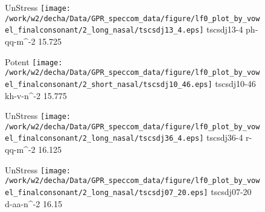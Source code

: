 \documentclass{article}
\begin{document}
\begin{figure}[t]
\begin{minipage}[b]{.24\textwidth}
UnStress
\centering
\texttt{[image: /work/w2/decha/Data/GPR\_speccom\_data/figure/lf0\_plot\_by\_vowel\_finalconsonant/2\_long\_nasal/tscsdj13\_4.eps]}
tscsdj13-4 ph-qq-m\textasciicircum-2 15.725
\end{minipage}
\begin{minipage}[b]{.24\textwidth}
\colorbox{Apricot}{Potent}
\centering
\texttt{[image: /work/w2/decha/Data/GPR\_speccom\_data/figure/lf0\_plot\_by\_vowel\_finalconsonant/2\_short\_nasal/tscsdj10\_46.eps]}
tscsdj10-46 kh-v-n\textasciicircum-2 15.775
\end{minipage}
\begin{minipage}[b]{.24\textwidth}
UnStress
\centering
\texttt{[image: /work/w2/decha/Data/GPR\_speccom\_data/figure/lf0\_plot\_by\_vowel\_finalconsonant/2\_long\_nasal/tscsdj36\_4.eps]}
tscsdj36-4 r-qq-m\textasciicircum-2 16.125
\end{minipage}
\begin{minipage}[b]{.24\textwidth}
UnStress
\centering
\texttt{[image: /work/w2/decha/Data/GPR\_speccom\_data/figure/lf0\_plot\_by\_vowel\_finalconsonant/2\_long\_nasal/tscsdj07\_20.eps]}
tscsdj07-20 d-aa-n\textasciicircum-2 16.15
\end{minipage}
\end{figure}
\end{document}
